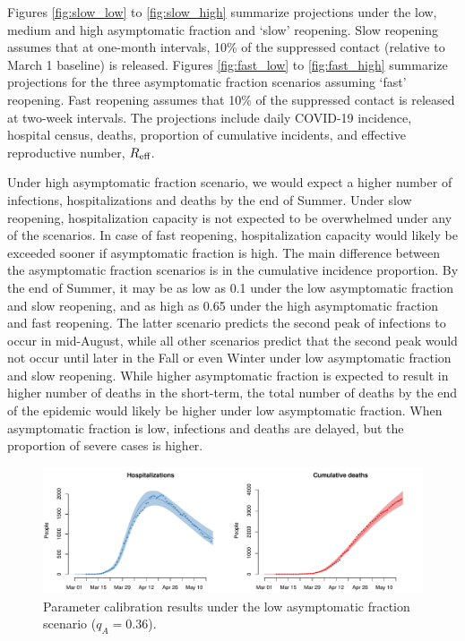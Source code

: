\documentclass[11pt]{article}
\begin{document}
Figures \ref{fig:slow_low} to \ref{fig:slow_high} summarize projections under the low, medium and high asymptomatic fraction and `slow' reopening. Slow reopening assumes that at one-month intervals, 10\% of the suppressed contact (relative to March 1 baseline) is released. Figures \ref{fig:fast_low} to \ref{fig:fast_high} summarize projections for the three asymptomatic fraction scenarios assuming `fast' reopening. Fast reopening assumes that 10\% of the suppressed contact is released at two-week intervals. The projections include daily COVID-19 incidence, hospital census, deaths, proportion of cumulative incidents, and effective reproductive number, $R\textsubscript{eff}$. 

Under high asymptomatic fraction scenario, we would expect a higher number of infections, hospitalizations and deaths by the end of Summer. 
Under slow reopening, hospitalization capacity is not expected to be overwhelmed under any of the scenarios. 
In case of fast reopening, hospitalization capacity would likely be exceeded sooner if asymptomatic fraction is high. 
The main difference between the asymptomatic fraction scenarios is in the cumulative incidence proportion. By the end of Summer, it may be as low as 0.1 under the low asymptomatic fraction and slow reopening, and as high as 0.65 under the high asymptomatic fraction and fast reopening. The latter scenario predicts the second peak of infections to occur in mid-August, while all other scenarios predict that the second peak would not occur until later in the Fall or even Winter under low asymptomatic fraction and slow reopening. While higher asymptomatic fraction is expected to result in higher number of deaths in the short-term, the total number of deaths by the end of the epidemic would likely be higher under low asymptomatic fraction. When asymptomatic fraction is low, infections and deaths are delayed, but the proportion of severe cases is higher. 


\begin{figure} %
	\centering
	\includegraphics[width=.8\textwidth]{figures/calibration.pdf}
	\caption{Parameter calibration results under the low asymptomatic fraction scenario ($q_A = 0.36$).}
	\label{fig:fit}
\end{figure}
\end{document}
